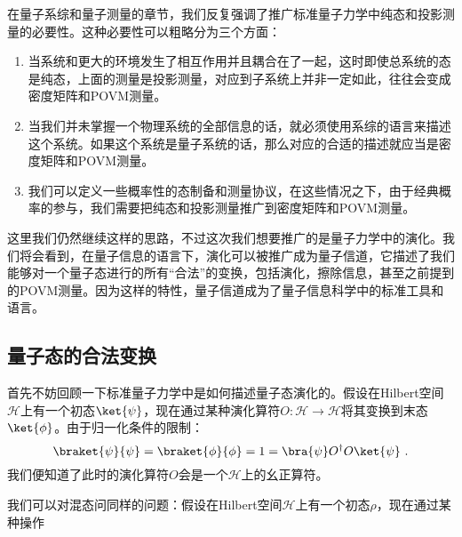 

在量子系综和量子测量的章节，我们反复强调了推广标准量子力学中纯态和投影测量的必要性。这种必要性可以粗略分为三个方面：
\begin{enumerate}
\item 当系统和更大的环境发生了相互作用并且耦合在了一起，这时即使总系统的态是纯态，上面的测量是投影测量，对应到子系统上并非一定如此，往往会变成密度矩阵和POVM测量。
\item 当我们并未掌握一个物理系统的全部信息的话，就必须使用系综的语言来描述这个系统。如果这个系统是量子系统的话，那么对应的合适的描述就应当是密度矩阵和POVM测量。
\item 我们可以定义一些概率性的态制备和测量协议，在这些情况之下，由于经典概率的参与，我们需要把纯态和投影测量推广到密度矩阵和POVM测量。
\end{enumerate}

这里我们仍然继续这样的思路，不过这次我们想要推广的是量子力学中的演化。我们将会看到，在量子信息的语言下，演化可以被推广成为量子信道，它描述了我们能够对一个量子态进行的所有“合法”的变换，包括演化，擦除信息，甚至之前提到的POVM测量。因为这样的特性，量子信道成为了量子信息科学中的标准工具和语言。

\subsection{量子态的合法变换}

首先不妨回顾一下标准量子力学中是如何描述量子态演化的。假设在Hilbert空间$\mathcal{H}$上有一个初态$\ket{\psi}$，现在通过某种演化算符$O:\mathcal{H}\to\mathcal{H}$将其变换到末态$\ket{\phi}$。由于归一化条件的限制：
\begin{equation}
\braket{\psi}{\psi}=\braket{\phi}{\phi}=1=\bra{\psi}O^\dagger O\ket{\psi}~.
\end{equation}
我们便知道了此时的演化算符$O$会是一个$\mathcal{H}$上的幺正算符。

我们可以对混态问同样的问题：假设在Hilbert空间$\mathcal{H}$上有一个初态$\rho$，现在通过某种操作